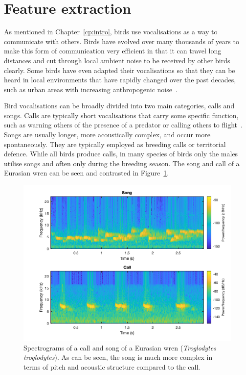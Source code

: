 \section{Feature extraction}\label{sec:feat_extraction}

As mentioned in Chapter~\ref{cp:intro}, birds use vocalisations as a way to
communicate with others. Birds have evolved over many thousands of years to make
this form of communication very efficient in that it can travel long distances
and cut through local ambient noise to be received by other birds clearly. Some
birds have even adapted their vocalisations so that they can be heard in local
environments that have rapidly changed over the past decades, such as urban
areas with increasing anthropogenic noise~\cite{luther2010urban}.

Bird vocalisations can be broadly divided into two main categories, calls and
songs. Calls are typically short vocalisations that carry some specific
function, such as warning others of the presence of a predator or calling others
to flight~\cite{MARLER2004132}. Songs are usually longer, more acoustically
complex, and occur more spontaneously. They are typically employed as breeding
calls or territorial defence. While all birds produce calls, in many species of
birds only the males utilise songs and often only during the breeding season. The
song and call of a Eurasian wren can be seen and contrasted in
Figure~\ref{fig:wren_call_song_spectrogram}.

\begin{figure}[ht]
  \centering
  \includegraphics[width=\textwidth]{figures/wren_call_song_spectrogram.png}
  \caption{Spectrograms of a call and song of a Eurasian wren
  (\textit{Troglodytes troglodytes}). As can be seen, the song is much more
complex in terms of pitch and acoustic structure compared to the
call.}\label{fig:wren_call_song_spectrogram}
\end{figure}


